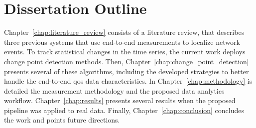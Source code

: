 \section{Dissertation Outline}

Chapter~\ref{chap:literature_review} consists of a literature review, that
describes three previous systems that use
end-to-end measurements to localize network events.
To track statistical changes in the time series, the current
work deploys change point detection methods. Then,
Chapter~\ref{chap:change_point_detection} presents several of these algorithms,
including the developed strategies to better handle the end-to-end \gls*{qos} data
characteristics.
In Chapter~\ref{chap:methodology} is detailed the measurement methodology and
the proposed data analytics workflow.
Chapter~\ref{chap:results} presents several results when the proposed pipeline
was applied to real data.
Finally, Chapter~\ref{chap:conclusion} concludes the work and
points future directions.
